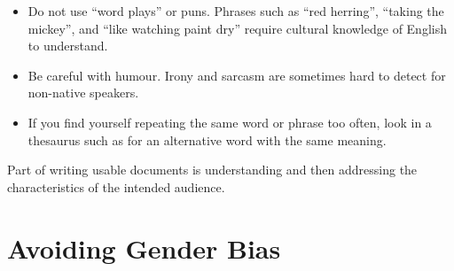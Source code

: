 \begin{itemize}
\item Do not use ``word plays'' or puns. Phrases such as ``red
  herring'', ``taking the mickey'', and ``like watching paint dry''
  require cultural knowledge of English to understand.


\item Be careful with humour. Irony and sarcasm are sometimes hard to
  detect for non-native speakers.


\item If you find yourself repeating the same word or phrase too often,
  look in a thesaurus such as \citet{Roget,RogetInt} for an
  alternative word with the same meaning.
\end{itemize}


Part of writing usable documents is understanding and then addressing
the characteristics of the intended audience.






\section{Avoiding Gender Bias}
\label{sec:Gender}

